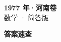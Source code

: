 \documentclass[zihao=-4, a4paper]{ctexart}
\begin{document}
\begin{center}
  {\Large\bfseries 1977 年·河南卷}\\[4pt]
  {\large 数学 · 简答版}
\end{center}
\medskip
{}

\clearpage
{}
\begin{center}{\Large\bfseries 答案速查}\end{center}
\medskip

\end{document}
